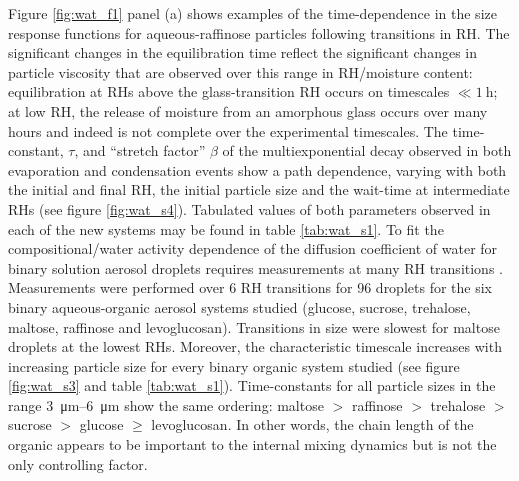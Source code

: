  Figure \ref{fig:wat_f1} panel (a) shows examples of the time-dependence in the size response functions for aqueous-raffinose particles following transitions in RH. The significant changes in the equilibration time reflect the significant changes in particle viscosity that are observed over this range in RH/moisture content: equilibration at RHs above the glass-transition RH occurs on timescales $\ll \SI{1}{\hour}$; at low RH, the release of moisture from an amorphous glass occurs over many hours and indeed is not complete over the experimental timescales. The time-constant, $\tau$, and ``stretch factor” $\beta$ of the multiexponential decay observed in both evaporation and condensation events show a path dependence, varying with both the initial and final RH, the initial particle size and the wait-time at intermediate RHs (see figure \ref{fig:wat_s4}). Tabulated values of both parameters observed in each of the new systems may be found in table \ref{tab:wat_s1}. To fit the compositional/water activity dependence of the diffusion coefficient of water for binary solution aerosol droplets requires measurements at many RH transitions \cite{Ingram2017,Rickards2015}.
Measurements were performed over \num{6} RH transitions for \num{96} droplets for the six binary aqueous-organic aerosol systems studied (glucose, sucrose, trehalose, maltose, raffinose and levoglucosan). Transitions in size were slowest for maltose droplets at the lowest RHs. Moreover, the characteristic timescale increases with increasing particle size for every binary organic system studied (see figure \ref{fig:wat_s3} and table \ref{tab:wat_s1}). Time-constants for all particle sizes in the range \SIrange{3}{6}{\micro\meter} show the same ordering: maltose $>$ raffinose $>$ trehalose $>$ sucrose $>$ glucose $\ge$ levoglucosan. In other words, the chain length of the organic appears to be important to the internal mixing dynamics but is not the only controlling factor.

